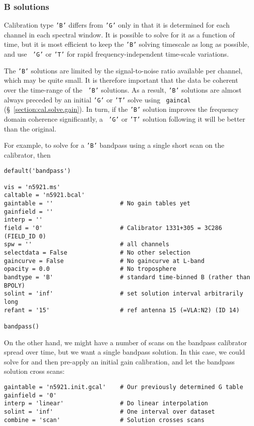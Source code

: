 \subsubsection{B solutions}
\label{section:cal.solve.band.b}

Calibration type {\tt 'B'} differs from {\tt 'G'} only in that it is
determined for each channel in each spectral window.  It is possible
to solve for it as a function of time, but it is most efficient to
keep the {\tt 'B'} solving timescale as long as possible, and use {\tt
'G'} or {\tt 'T'} for rapid frequency-independent time-scale variations.

The {\tt 'B'} solutions are limited by the signal-to-noise ratio
available per channel, which may be quite small.  It is therefore
important that the data be coherent over the time-range of the {\tt
'B'} solutions.  As a result, {\tt 'B'} solutions are almost always
preceded by an initial {\tt 'G'} or {\tt 'T'} solve using {\tt
gaincal} (\S~\ref{section:cal.solve.gain}).  In turn, if the {\tt 'B'}
solution improves the frequency domain coherence significantly, a {\tt
'G'} or {\tt 'T'} solution following it will be better than the
original.

For example, to solve for a {\tt 'B'} bandpass using a single short
scan on the calibrator, then
\small
\begin{verbatim}
default('bandpass')

vis = 'n5921.ms'
caltable = 'n5921.bcal'
gaintable = ''                   # No gain tables yet
gainfield = ''
interp = ''
field = '0'                      # Calibrator 1331+305 = 3C286 (FIELD_ID 0)
spw = ''                         # all channels
selectdata = False               # No other selection
gaincurve = False                # No gaincurve at L-band
opacity = 0.0                    # No troposphere
bandtype = 'B'                   # standard time-binned B (rather than BPOLY)
solint = 'inf'                   # set solution interval arbitrarily long
refant = '15'                    # ref antenna 15 (=VLA:N2) (ID 14)

bandpass()
\end{verbatim}
\normalsize

On the other hand, we might have a number of scans on the bandpass
calibrator spread over time, but we want a single bandpass solution.
In this case, we could solve for and then pre-apply an initial gain
calibration, and let the bandpass solution cross scans:
\small
\begin{verbatim}
gaintable = 'n5921.init.gcal'    # Our previously determined G table
gainfield = '0'
interp = 'linear'                # Do linear interpolation
solint = 'inf'                   # One interval over dataset
combine = 'scan'                 # Solution crosses scans
\end{verbatim}
\normalsize

